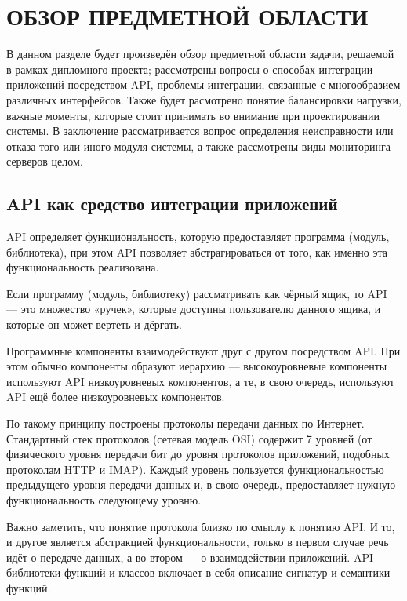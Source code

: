 \section{ОБЗОР ПРЕДМЕТНОЙ ОБЛАСТИ}

В данном разделе будет произведён обзор предметной области задачи, решаемой в рамках дипломного проекта; рассмотрены вопросы о способах интеграции приложений посредством API, проблемы интеграции, связанные с многообразием различных интерфейсов. Также будет расмотрено понятие балансировки нагрузки, важные моменты, которые стоит принимать во внимание при проектировании системы. В заключение рассматривается вопрос определения неисправности или отказа того или иного модуля системы, а также рассмотрены виды мониторинга серверов целом.

\subsection{API как средство интеграции приложений}
API определяет функциональность, которую предоставляет программа (модуль, библиотека), при этом API позволяет абстрагироваться от того, как именно эта функциональность реализована.

Если программу (модуль, библиотеку) рассматривать как чёрный ящик, то API — это множество «ручек», которые доступны пользователю данного ящика, и которые он может вертеть и дёргать.

Программные компоненты взаимодействуют друг с другом посредством API. При этом обычно компоненты образуют иерархию — высокоуровневые компоненты используют API низкоуровневых компонентов, а те, в свою очередь, используют API ещё более низкоуровневых компонентов.

По такому принципу построены протоколы передачи данных по Интернет. Стандартный стек протоколов (сетевая модель OSI) содержит 7 уровней (от физического уровня передачи бит до уровня протоколов приложений, подобных протоколам HTTP и IMAP). Каждый уровень пользуется функциональностью предыдущего уровня передачи данных и, в свою очередь, предоставляет нужную функциональность следующему уровню.

Важно заметить, что понятие протокола близко по смыслу к понятию API. И то, и другое является абстракцией функциональности, только в первом случае речь идёт о передаче данных, а во втором — о взаимодействии приложений.
API библиотеки функций и классов включает в себя описание сигнатур и семантики функций.


